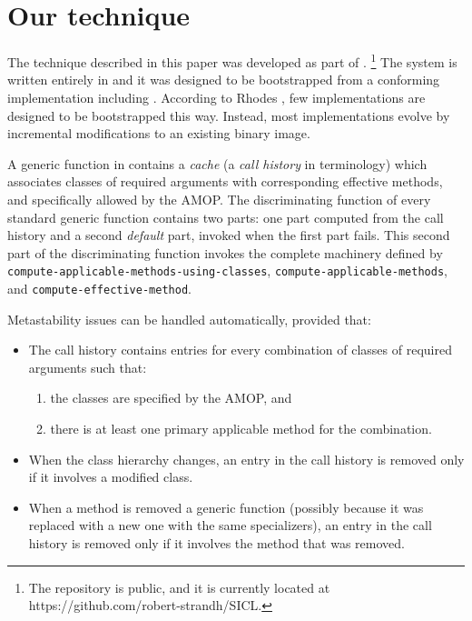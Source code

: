 \section{Our technique}

The technique described in this paper was developed as part of
\sicl{}.%
\footnote{The \sicl{} repository is public, and it is currently
  located at https://github.com/robert-strandh/SICL.}  The system is
written entirely in \cl{} and it was designed to be bootstrapped 
from a conforming \cl{} implementation including \clos{}.  
According to Rhodes \cite{Rhodes:2008:SSC:1482373.1482380}, few \cl{}
implementations are designed to be bootstrapped this way.  Instead,
most implementations evolve by incremental modifications to an
existing binary image.

A generic function in \sicl{} contains a \emph{cache} (a \emph{call
  history} in \sicl{} terminology) which associates classes of
required arguments with corresponding effective methods, and
specifically allowed by the AMOP.  The discriminating function of
every standard generic function contains two parts: one part computed
from the call history and a second \emph{default} part, invoked when
the first part fails.  This second part of the discriminating function
invokes the complete machinery defined by
\texttt{compute-applicable-methods-using-classes},
\texttt{compute-applicable-methods}, and
\texttt{compute-effective-method}.

Metastability issues can be handled automatically, provided that:

\begin{itemize}
\item The call history contains entries for every combination of
  classes of required arguments such that:
  \begin{enumerate}
  \item the classes are specified by the AMOP, and 
  \item there is at least one primary applicable method for the
    combination.
  \end{enumerate}
\item When the class hierarchy changes, an entry in the call history
  is removed only if it involves a modified class.
\item When a method is removed a generic function (possibly because it
  was replaced with a new one with the same specializers), an entry in
  the call history is removed only if it involves the method that was
  removed.
\end{itemize}

